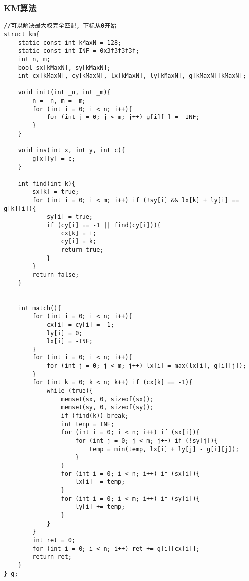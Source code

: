 \subsubsection{KM算法}
\begin{verbatim}
//可以解决最大权完全匹配, 下标从0开始
struct km{
    static const int kMaxN = 128;
    static const int INF = 0x3f3f3f3f;
    int n, m;
    bool sx[kMaxN], sy[kMaxN];
    int cx[kMaxN], cy[kMaxN], lx[kMaxN], ly[kMaxN], g[kMaxN][kMaxN];

    void init(int _n, int _m){
        n = _n, m = _m;
        for (int i = 0; i < n; i++){
            for (int j = 0; j < m; j++) g[i][j] = -INF;
        }
    }

    void ins(int x, int y, int c){
        g[x][y] = c;
    }

    int find(int k){
        sx[k] = true;
        for (int i = 0; i < m; i++) if (!sy[i] && lx[k] + ly[i] == g[k][i]){
            sy[i] = true;
            if (cy[i] == -1 || find(cy[i])){
                cx[k] = i;
                cy[i] = k;
                return true;
            }
        }
        return false;
    }


    int match(){
        for (int i = 0; i < n; i++){
            cx[i] = cy[i] = -1;
            ly[i] = 0;
            lx[i] = -INF;
        }
        for (int i = 0; i < n; i++){
            for (int j = 0; j < m; j++) lx[i] = max(lx[i], g[i][j]);
        }
        for (int k = 0; k < n; k++) if (cx[k] == -1){
            while (true){
                memset(sx, 0, sizeof(sx));
                memset(sy, 0, sizeof(sy));
                if (find(k)) break;
                int temp = INF;
                for (int i = 0; i < n; i++) if (sx[i]){
                    for (int j = 0; j < m; j++) if (!sy[j]){
                        temp = min(temp, lx[i] + ly[j] - g[i][j]);
                    }
                }
                for (int i = 0; i < n; i++) if (sx[i]){
                    lx[i] -= temp;
                }
                for (int i = 0; i < m; i++) if (sy[i]){
                    ly[i] += temp;
                }
            }
        }
        int ret = 0;
        for (int i = 0; i < n; i++) ret += g[i][cx[i]];
        return ret;
    }
} g; 
\end{verbatim}
